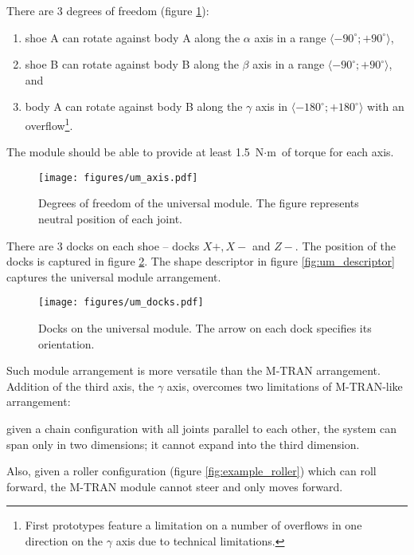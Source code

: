 There are 3 degrees of freedom (figure \ref{fig:um_axis}):
\begin{enumerate}
    \item shoe A can rotate against body A along the $\alpha$ axis in a range
    $\langle -90^\circ; +90^\circ\rangle$,
    \item shoe B can rotate against body B along the $\beta$ axis in a range
    $\langle -90^\circ; +90^\circ\rangle$, and
    \item body A can rotate against body B along the $\gamma$ axis in $\langle
    -180^\circ; +180^\circ\rangle$ with an overflow\footnote{First prototypes
    feature a limitation on a number of overflows in one direction on the
    $\gamma$ axis due to technical limitations. }.
\end{enumerate}
The module should be able to provide at least 1.5 $\text{N}\cdot\text{m}$ of
torque for each axis.

\begin{figure}
    \centering
    \texttt{[image: figures/um\_axis.pdf]}
    \caption{Degrees of freedom of the universal module. The figure represents
    neutral position of each joint.}
    \label{fig:um_axis}
\end{figure}

There are 3 docks on each shoe -- docks $X+, X-$ and $Z-$. The position of the
docks is captured in figure \ref{fig:um_docks}. The shape descriptor in figure
\ref{fig:um_descriptor} captures the universal module arrangement.

\begin{figure}
    \centering
    \texttt{[image: figures/um\_docks.pdf]}
    \caption{Docks on the universal module. The arrow on each dock specifies its orientation.}
    \label{fig:um_docks}
\end{figure}

Such module arrangement is more versatile than the M-TRAN arrangement. Addition
of the third axis, the $\gamma$ axis, overcomes two limitations of M-TRAN-like
arrangement:
\begin{enumerate*}
    \item given a chain configuration with all joints parallel to each other,
    the system can span only in two dimensions; it cannot expand into the third
    dimension.
    \item Also, given a roller configuration (figure \ref{fig:example_roller})
    which can roll forward, the M-TRAN module cannot steer and only moves
    forward.
\end{enumerate*}

